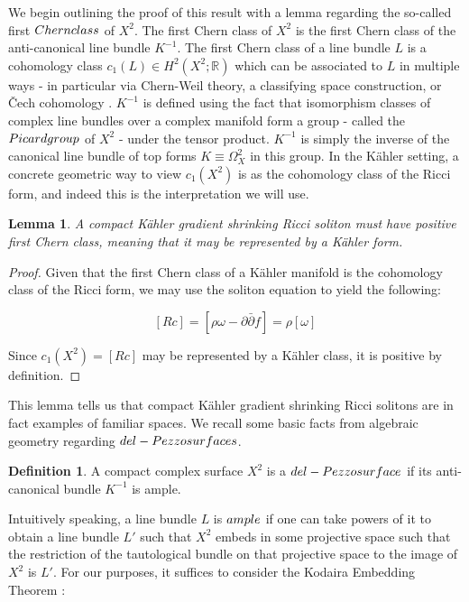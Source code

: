 \documentclass[openany, amssymb, psamsfonts]{amsart}
\newtheorem{lem}{Lemma}[section]
\theoremstyle{definition}
\newtheorem{defn}{Definition}[section]
\numberwithin{equation}{section}
\begin{document}
We begin outlining the proof of this result with a lemma regarding the so-called first $\emph{Chern class}$ of $X^2$. The first Chern class of $X^2$ is the first Chern class of the anti-canonical line bundle $K^{-1}$. The first Chern class of a line bundle $L$ is a cohomology class $c_1(L) \in H^2(X^2;\mathbb{R})$ which can be associated to $L$ in multiple ways - in particular via Chern-Weil theory, a classifying space construction, or Čech cohomology \cite{wells}. $K^{-1}$ is defined using the fact that isomorphism classes of complex line bundles over a complex manifold form a group - called the $\emph{Picard group}$ of $X^2$ - under the tensor product. $K^{-1}$ is simply the inverse of the canonical line bundle of top forms $K \equiv \Omega_X^2$ in this group. In the Kähler setting, a concrete geometric way to view $c_1(X^2)$ is as the cohomology class of the Ricci form, and indeed this is the interpretation we will use. 

\begin{lem}
A compact Kähler gradient shrinking Ricci soliton must have positive first Chern class, meaning that it may be represented by a Kähler form. 
\end{lem}

\begin{proof}
Given that the first Chern class of a Kähler manifold is the cohomology class of the Ricci form, we may use the soliton equation to yield the following:

$$[Rc] = [\rho \omega - \partial \bar{\partial} f] = \rho [\omega]$$

Since $c_1(X^2) = [Rc]$ may be represented by a Kähler class, it is positive by definition. 

\end{proof}


This lemma tells us that compact Kähler gradient shrinking Ricci solitons are in fact examples of familiar spaces. We recall some basic facts from algebraic geometry regarding $\emph{del-Pezzo surfaces}$. 

\begin{defn}

A compact complex surface $X^2$ is a $\emph{del-Pezzo surface}$ if its anti-canonical bundle $K^{-1}$ is ample.

\end{defn}

  Intuitively speaking, a line bundle $L$ is $\emph{ample}$ if one can take powers of it to obtain a line bundle $L'$ such that $X^2$ embeds in some projective space such that the restriction of the tautological bundle on that projective space to the image of $X^2$ is $L'$. For our purposes, it suffices to consider the Kodaira Embedding Theorem \cite{huy}:
\end{document}
